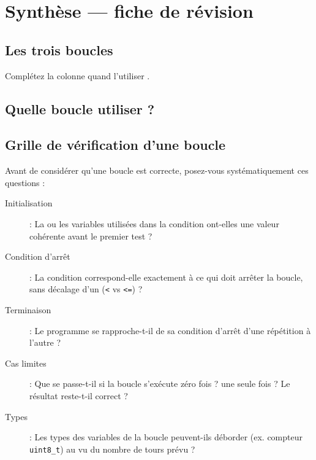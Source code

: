 
\section{Synthèse --- fiche de révision}

\subsection{Les trois boucles}

Complétez la colonne \og quand l'utiliser \fg{}.

\TableRecapBoucles




\subsection{Quelle boucle utiliser ?}

\TrouTreize 

\subsection{Grille de vérification d'une boucle}

Avant de considérer qu'une boucle est correcte, posez-vous systématiquement ces questions :

\begin{description}
  \item [Initialisation] : La ou les variables utilisées dans la condition ont-elles une valeur cohérente avant le premier test ?
  \item [Condition d'arrêt] : La condition correspond-elle exactement à ce qui doit arrêter la boucle, sans décalage d'un (\texttt{<} vs \texttt{<=}) ?
  \item [Terminaison] : Le programme se rapproche-t-il de sa condition d'arrêt d'une répétition à l'autre ?
  \item [Cas limites] : Que se passe-t-il si la boucle s'exécute zéro fois ? une seule fois ? Le résultat reste-t-il correct ?
  \item [Types] : Les types des variables de la boucle peuvent-ils déborder (ex. compteur \texttt{uint8\_t}) au vu du nombre de tours prévu ?
\end{description}%
